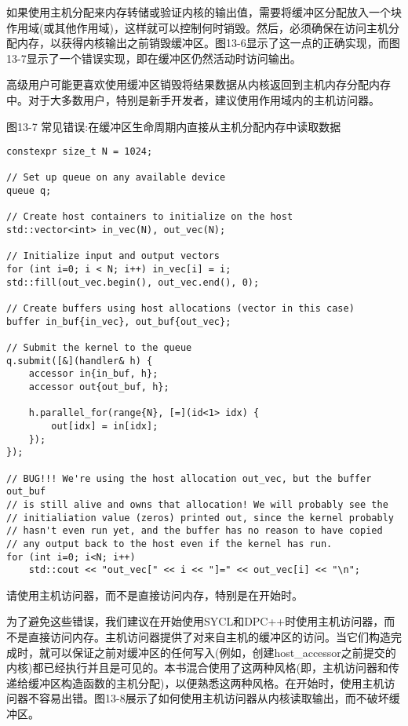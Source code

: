 如果使用主机分配来内存转储或验证内核的输出值，需要将缓冲区分配放入一个块作用域(或其他作用域)，这样就可以控制何时销毁。然后，必须确保在访问主机分配内存，以获得内核输出之前销毁缓冲区。图13-6显示了这一点的正确实现，而图13-7显示了一个错误实现，即在缓冲区仍然活动时访问输出。\par

\begin{tcolorbox}[colback=red!5!white,colframe=red!75!black]
高级用户可能更喜欢使用缓冲区销毁将结果数据从内核返回到主机内存分配内存中。对于大多数用户，特别是新手开发者，建议使用作用域内的主机访问器。
\end{tcolorbox}

\hspace*{\fill} \par %
图13-7 常见错误:在缓冲区生命周期内直接从主机分配内存中读取数据
\begin{lstlisting}[caption={}]
constexpr size_t N = 1024;

// Set up queue on any available device
queue q;

// Create host containers to initialize on the host
std::vector<int> in_vec(N), out_vec(N);

// Initialize input and output vectors
for (int i=0; i < N; i++) in_vec[i] = i;
std::fill(out_vec.begin(), out_vec.end(), 0);

// Create buffers using host allocations (vector in this case)
buffer in_buf{in_vec}, out_buf{out_vec};

// Submit the kernel to the queue
q.submit([&](handler& h) {
	accessor in{in_buf, h};
	accessor out{out_buf, h};
	
	h.parallel_for(range{N}, [=](id<1> idx) {
		out[idx] = in[idx];
	});
});

// BUG!!! We're using the host allocation out_vec, but the buffer out_buf
// is still alive and owns that allocation! We will probably see the
// initialiation value (zeros) printed out, since the kernel probably
// hasn't even run yet, and the buffer has no reason to have copied
// any output back to the host even if the kernel has run.
for (int i=0; i<N; i++)
	std::cout << "out_vec[" << i << "]=" << out_vec[i] << "\n";
\end{lstlisting}

\begin{tcolorbox}[colback=red!5!white,colframe=red!75!black]
请使用主机访问器，而不是直接访问内存，特别是在开始时。
\end{tcolorbox}

为了避免这些错误，我们建议在开始使用SYCL和DPC++时使用主机访问器，而不是直接访问内存。主机访问器提供了对来自主机的缓冲区的访问。当它们构造完成时，就可以保证之前对缓冲区的任何写入(例如，创建host\_accessor之前提交的内核)都已经执行并且是可见的。本书混合使用了这两种风格(即，主机访问器和传递给缓冲区构造函数的主机分配)，以便熟悉这两种风格。在开始时，使用主机访问器不容易出错。图13-8展示了如何使用主机访问器从内核读取输出，而不破坏缓冲区。\par

